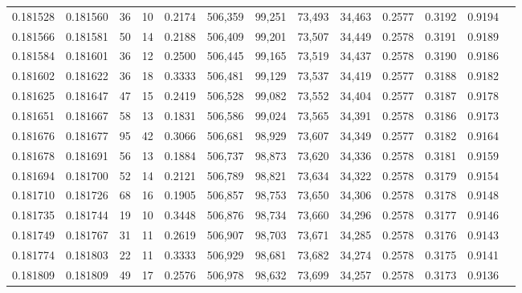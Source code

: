 \begin{tabular}{rrrrrrrrrrrrr}
0.181528 & 0.181560 &    36 &  10 &                                     0.2174 & 506,359 &  99,251 &  73,493 &  34,463 & 0.2577 & 0.3192 & 0.9194 \\
0.181566 & 0.181581 &    50 &  14 &                                     0.2188 & 506,409 &  99,201 &  73,507 &  34,449 & 0.2578 & 0.3191 & 0.9189 \\
0.181584 & 0.181601 &    36 &  12 &                                     0.2500 & 506,445 &  99,165 &  73,519 &  34,437 & 0.2578 & 0.3190 & 0.9186 \\
0.181602 & 0.181622 &    36 &  18 &                                     0.3333 & 506,481 &  99,129 &  73,537 &  34,419 & 0.2577 & 0.3188 & 0.9182 \\
0.181625 & 0.181647 &    47 &  15 &                                     0.2419 & 506,528 &  99,082 &  73,552 &  34,404 & 0.2577 & 0.3187 & 0.9178 \\
0.181651 & 0.181667 &    58 &  13 &                                     0.1831 & 506,586 &  99,024 &  73,565 &  34,391 & 0.2578 & 0.3186 & 0.9173 \\
0.181676 & 0.181677 &    95 &  42 &                                     0.3066 & 506,681 &  98,929 &  73,607 &  34,349 & 0.2577 & 0.3182 & 0.9164 \\
0.181678 & 0.181691 &    56 &  13 &                                     0.1884 & 506,737 &  98,873 &  73,620 &  34,336 & 0.2578 & 0.3181 & 0.9159 \\
0.181694 & 0.181700 &    52 &  14 &                                     0.2121 & 506,789 &  98,821 &  73,634 &  34,322 & 0.2578 & 0.3179 & 0.9154 \\
0.181710 & 0.181726 &    68 &  16 &                                     0.1905 & 506,857 &  98,753 &  73,650 &  34,306 & 0.2578 & 0.3178 & 0.9148 \\
0.181735 & 0.181744 &    19 &  10 &                                     0.3448 & 506,876 &  98,734 &  73,660 &  34,296 & 0.2578 & 0.3177 & 0.9146 \\
0.181749 & 0.181767 &    31 &  11 &                                     0.2619 & 506,907 &  98,703 &  73,671 &  34,285 & 0.2578 & 0.3176 & 0.9143 \\
0.181774 & 0.181803 &    22 &  11 &                                     0.3333 & 506,929 &  98,681 &  73,682 &  34,274 & 0.2578 & 0.3175 & 0.9141 \\
0.181809 & 0.181809 &    49 &  17 &                                     0.2576 & 506,978 &  98,632 &  73,699 &  34,257 & 0.2578 & 0.3173 & 0.9136 \\

\end{tabular}
